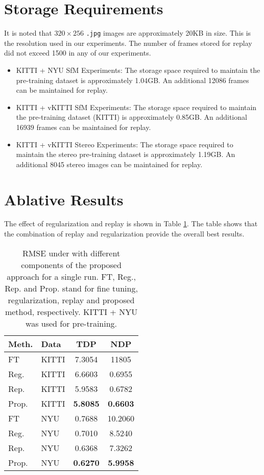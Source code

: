 \documentclass[lettersize,journal]{IEEEtran}
\begin{document}
 \section{Storage Requirements}
 It is noted that $320 \times 256$ \texttt{.jpg} images are approximately 20KB in size. This is the resolution used in our experiments. The number of frames stored for replay did not exceed 1500 in any of our experiments.
 \begin{itemize}
 \item KITTI + NYU SfM Experiments: The storage space required to maintain the pre-training dataset is approximately 1.04GB. An additional 12086 frames can be maintained for replay. 
 
 \item KITTI + vKITTI SfM Experiments: The storage space required to maintain the pre-training dataset (KITTI) is approximately 0.85GB. An additional 16939 frames can be maintained for replay. 
 
 \item KITTI + vKITTI Stereo Experiments: The storage space required to maintain the stereo pre-training dataset is approximately 1.19GB. An additional 8045 stereo images can be maintained for replay.
 \end{itemize}
 
 
 \section{Ablative Results}
 The effect of regularization and replay is shown in Table \ref{tab:ablative}. The table shows that the combination of replay and regularization provide the overall best results.
 
 
 \begin{table}
    \begin{center}
       \small
       \begin{tabular}{llcc}
          \hline 
          Meth. & Data & TDP & NDP\\ 
          \hline \hline 
          FT & KITTI & 7.3054 & 11805 \\
          Reg. & KITTI & 6.6603 & 0.6955 \\
          Rep. & KITTI & 5.9583 & 0.6782 \\
          Prop. & KITTI & \textbf{5.8085} & \textbf{0.6603} \\
          \hline
          FT & NYU & 0.7688 & 10.2060 \\
          Reg. & NYU & 0.7010 & 8.5240 \\
          Rep. & NYU & 0.6368 & 7.3262 \\
          Prop. & NYU & \textbf{0.6270} & \textbf{5.9958} \\
          \hline
       \end{tabular}
    \end{center}
    \caption{RMSE under with different components of the proposed approach for a single run. FT, Reg., Rep. and Prop. stand for fine tuning, regularization, replay and proposed method, respectively. KITTI + NYU was used for pre-training.}
    \label{tab:ablative}
 \end{table}
 
\end{document}
